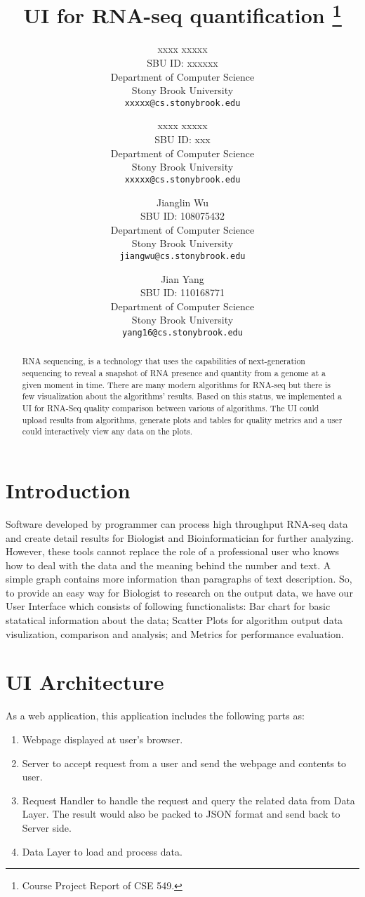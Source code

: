 \documentclass[11pt,letter]{article}
\title{UI for RNA-seq quantification \footnote{Course Project Report of CSE 549.}}
\author{
xxxx xxxxx\\
       {\small SBU ID: xxxxxx}\\
       {\small Department of Computer Science}\\
       {\small Stony Brook University} \\
       {\small \texttt{xxxxx@cs.stonybrook.edu}}
\and
xxxx xxxxx \\
       {\small SBU ID: xxx}\\
       {\small Department of Computer Science}\\
       {\small Stony Brook University} \\
       {\small \texttt{xxxxx@cs.stonybrook.edu}}
\and
Jianglin Wu \\
       {\small SBU ID: 108075432}\\
       {\small Department of Computer Science}\\
       {\small Stony Brook University} \\
       {\small \texttt{jiangwu@cs.stonybrook.edu}}
\and
Jian Yang \\
       {\small SBU ID: 110168771}\\
       {\small Department of Computer Science}\\
       {\small Stony Brook University}\\
       {\small \texttt{yang16@cs.stonybrook.edu}}
}
\date{}
\begin{document}
\maketitle

\begin{abstract}
RNA sequencing, is a technology that uses the capabilities of next-generation sequencing to reveal a snapshot of RNA presence and quantity from a genome at a given moment in time. There are many modern algorithms for RNA-seq but there is few visualization about the algorithms' results. Based on this status, we implemented a UI for RNA-Seq quality comparison between various of algorithms. The UI could upload results from algorithms, generate plots and tables for quality metrics and a user could interactively view any data on the plots.
\end{abstract}

\thispagestyle{empty}
\addtocounter{page}{0}

\section {Introduction}

Software developed by programmer can process high throughput RNA-seq data and create detail results for Biologist and Bioinformatician for further analyzing. However, these tools cannot replace the role of a professional user who knows how to deal with the data and the meaning behind the number and text.  A simple graph contains more information than paragraphs of text description.  So, to provide an easy way for Biologist to research on the output data, we have our User Interface which consists of following functionalists: Bar chart for basic statatical information about the data; Scatter Plots for algorithm output data visulization, comparison and analysis; and Metrics for performance evaluation.   \\


\section {UI Architecture}
As a web application, this application includes the following parts as: \\
\begin{enumerate}
\item Webpage displayed at user's browser.
\item Server to accept request from a user and send the webpage and contents to user.
\item Request Handler to handle the request and query the related data from Data Layer. The result would also be packed to JSON format and send back to Server side.
\item Data Layer to load and process data.
\end{enumerate}
\end{document}
